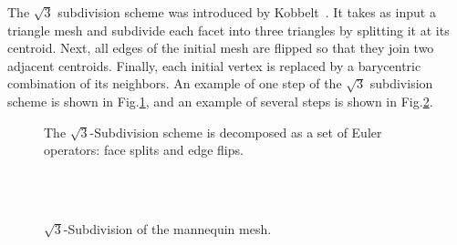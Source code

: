 \label{sec:subdivision_euler}

The $\sqrt{3}$ subdivision scheme was introduced by
Kobbelt~\cite{k-sqrt3-00}. It takes as input a triangle mesh and
subdivide each facet into three triangles by splitting it at its
centroid. Next, all edges of the initial mesh are flipped so that they
join two adjacent centroids. Finally, each initial vertex is replaced
by a barycentric combination of its neighbors. An example of one step
of the $\sqrt{3}$ subdivision scheme is shown in
Fig.\ref{fig:sqrt3_basic}, and an example of several steps is shown in
Fig.\ref{fig:sqrt3}.


\begin{figure}[htb]
    \caption{The $\sqrt{3}$-Subdivision scheme is decomposed as
             a set of Euler operators: face splits and edge flips.}
    \label{fig:sqrt3_basic}
\end{figure}

{ 

\scriptsize
\begin{verbatim}



\end{verbatim}
}


\begin{figure}[htb]
    \caption{$\sqrt{3}$-Subdivision of the mannequin mesh.}
    \label{fig:sqrt3}
\end{figure}
